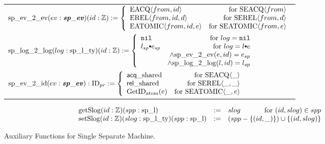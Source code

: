 \begin{figure}
\noindent{}
\begin{center}
\begin{tabular}{l}
$
   {\mathrm{sp}\_\mathrm{ev}\_2\_\mathrm{ev}}(ev : {\mathrm{\textbf{\textit{sp}}}\_\mathrm{\textbf{\textit{ev}}}}) (id : {\mathbb{Z}}) 
      :=  \left\{\begin{array}{lr}
        {{\mathrm{EACQ}}\langle{from}, {id}\rangle} & \text{for } {{\mathrm{SEACQ}}\langle{from}\rangle}\\
        {{\mathrm{EREL}}\langle{from}, {id}, {d}\rangle} & \text{for } {{\mathrm{SEREL}}\langle{from}, {d}\rangle}\\
        {{\mathrm{EATOMIC}}\langle{from}, {id}, {e}\rangle} & \text{for } {{\mathrm{SEATOMIC}}\langle{from},{e}\rangle} \\
        \end{array} \right.
$\\
$
   \separatelogtwologkwd(log : \separatelogtypekwd) (id : \ztype) 
      :=  \left\{\begin{array}{lr}
        \nulllist & \text{for } log = \nulllist \\
        \listconsoppo{e_{sp}}{l_{sp}} & \text{for }  log = \listconsoppo{e}{l} \\
        & \wedge \separateeventtwoevent{e}{id}{e_{sp}}\\
        & \wedge \separatelogtwolog{l}{id}{l_{sp}}\\
        \end{array} \right.
$\\
$
{\mathrm{sp}\_\mathrm{ev}\_2\_\mathrm{id}} (ev : {\mathrm{\textbf{\textit{sp}}}\_\mathrm{\textbf{\textit{ev}}}}) : {\mathrm{ID}_{pr}} :=
 \left\{\begin{array}{lr}
         {\mbox{\textsf{acq}}\_\mbox{shared}}& \text{for } {{\mathrm{SEACQ}}\langle{\_}\rangle}\\
        {\mbox{\textsf{rel}}\_\mbox{shared}} & \text{for } {{\mathrm{SEREL}}\langle{\_}, {\_}\rangle}\\
        {\mathrm{GetID}_{\mathrm{atom}}({e})} & \text{for } {{\mathrm{SEATOMIC}}\langle{\_},{e}\rangle} \\
 \end{array} \right.
$\\
\end{tabular}
\end{center}
$$
\begin{array}{lll}
  \getseplogkwd (id :\ztype)(spp : \separatelogkwd)  &:= & slog \hfill{\text{for } (id, slog) \in spp}\\
   \setseplogkwd (id :\ztype) (slog : \separatelogtypekwd) (spp: \separatelogkwd) &:= &(spp - \set{(id, \_)})  \cup \set{(id, slog)}\\
\end{array}
$$
\caption{Auxiliary Functions for Single Separate Machine.}
\label{fig:chapter:conlink:auxiliary-funcitons-for-single-separate-machine}
\end{figure}

